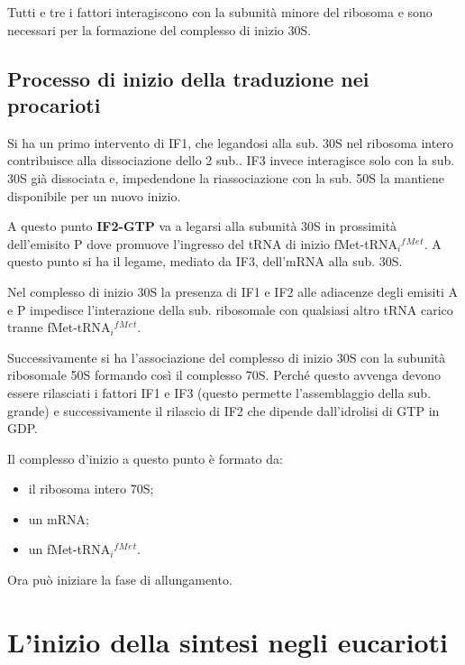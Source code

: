 \documentclass[11pt]{book}
\begin{document}
Tutti e tre i fattori interagiscono con la subunità minore del ribosoma
e sono necessari per la formazione del complesso di inizio 30S.

\subsection{Processo di inizio della traduzione nei
procarioti}\label{processo-di-inizio-della-traduzione-nei-procarioti}

Si ha un primo intervento di IF1, che legandosi alla sub. 30S nel
ribosoma intero contribuisce alla dissociazione dello 2 sub.. IF3 invece
interagisce solo con la sub. 30S già dissociata e, impedendone la
riassociazione con la sub. 50S la mantiene disponibile per un nuovo
inizio.

A questo punto \textbf{IF2-GTP} va a legarsi alla subunità 30S in
prossimità dell'emisito P dove promuove l'ingresso del tRNA di inizio
fMet-tRNA\(_i\)\(^f\)\(^M\)\(^e\)\(^t\). A questo punto si ha il legame,
mediato da IF3, dell'mRNA alla sub. 30S.

Nel complesso di inizio 30S la presenza di IF1 e IF2 alle adiacenze
degli emisiti A e P impedisce l'interazione della sub. ribosomale con
qualsiasi altro tRNA carico tranne
fMet-tRNA\(_i\)\(^f\)\(^M\)\(^e\)\(^t\).

Successivamente si ha l'associazione del complesso di inizio 30S con la
subunità ribosomale 50S formando così il complesso 70S. Perché questo
avvenga devono essere rilasciati i fattori IF1 e IF3 (questo permette
l'assemblaggio della sub. grande) e successivamente il rilascio di IF2
che dipende dall'idrolisi di GTP in GDP.

Il complesso d'inizio a questo punto è formato da:

\begin{itemize}
\itemsep1pt\parskip0pt
\item
  il ribosoma intero 70S;
\item
  un mRNA;
\item
  un fMet-tRNA\(_i\)\(^f\)\(^M\)\(^e\)\(^t\).
\end{itemize}

Ora può iniziare la fase di allungamento.

\section{L'inizio della sintesi negli
eucarioti}\label{linizio-della-sintesi-negli-eucarioti}
\end{document}
